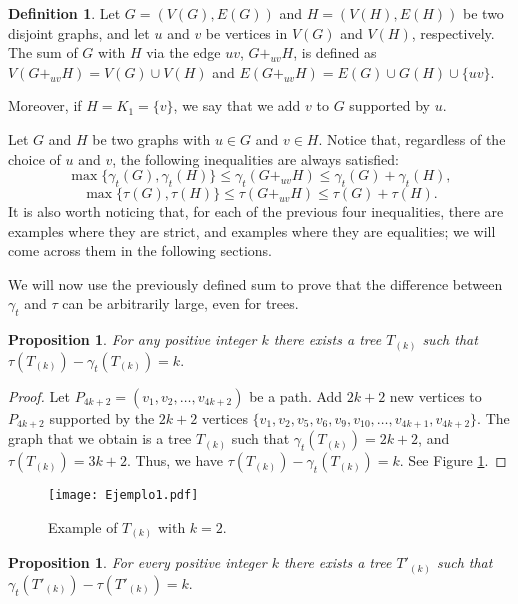 \documentclass[12pt]{article}%
\newtheorem{proposition}[theorem]{Proposition}
\theoremstyle{definition}
\newtheorem{definition}{Definition}
\begin{document}
\begin{definition}
Let $G=(V(G), E(G))$ and $H=(V(H), E(H))$ be two disjoint
graphs, and let $u$ and $v$ be vertices in $V(G)$ and $V(H)$,
respectively.   The sum of $G$ with $H$ via the edge $uv$,
$G +_{uv} H$, is defined as $V(G +_{uv} H)=V(G) \cup V(H)$
and $E(G +_{uv} H) = E(G) \cup G(H)\cup \{uv\}$.

Moreover, if $H = K_1 = \{ v \}$, we say that we add $v$ to
$G$ supported by $u$.  
\end{definition}

Let $G$ and $H$ be two graphs with $u \in G$ and $v \in H$.
Notice that, regardless of the choice of $u$ and $v$, the
following inequalities are always satisfied: $$\max \{ \gamma_t
(G), \gamma_t (H) \} \le \gamma_t (G +_{uv} H) \le \gamma_t
(G) + \gamma_t (H),$$ $$\max \{ \tau (G), \tau (H) \} \le \tau
(G +_{uv} H) \le \tau (G) + \tau (H).$$   It is also worth noticing
that, for each of the previous four inequalities, there are
examples where they are strict, and examples where they are
equalities; we will come across them in the following sections.

We will now use the previously defined sum to prove that the
difference between $\gamma_t$ and $\tau$ can be arbitrarily
large, even for trees.

\begin{proposition} For any positive integer $k$ there exists a
tree $T_{(k)}$ such that $\tau(T_{(k)}) - \gamma_t(T_{(k)}) = k.$
\end{proposition}

\begin{proof}
Let $P_{4k+2}=(v_1,v_2,\ldots,v_{4k+2})$ be a path. Add
$2k+2$ new vertices to $P_{4k+2}$ supported by the $2k+2$
vertices  $\{ v_1, v_2, v_5, v_6, v_9, v_{10}, \ldots, v_{4k+1},
v_{4k+2} \}$.   The graph that we obtain is a tree $T_{(k)}$ such
that $\gamma_t(T_{(k)})=2k+2$, and $\tau(T_{(k)})=3k+2$.
Thus, we have $\tau(T_{(k)})-\gamma_t(T_{(k)})=k.$   See
Figure \ref{fig1}.
\end{proof}

\begin{figure}[h]
\centering
  \texttt{[image: Ejemplo1.pdf]}
 \caption{Example of $T_{(k)}$ with  $k=2$.} \label{fig1}
\end{figure}
	


\begin{proposition} For every positive integer $k$ there exists a
tree $T'_{(k)}$ such that $\gamma_t (T'_{(k)}) - \tau(T'_{(k)})=k.$
\end{proposition}
\end{document}
